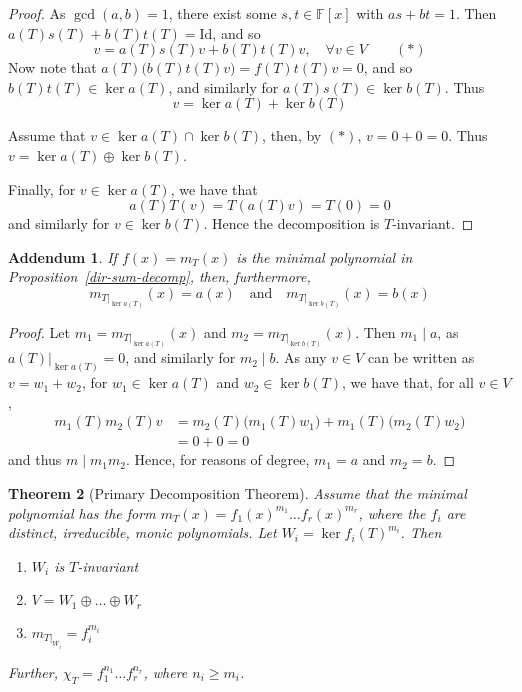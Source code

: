 \documentclass[10pt,fleqn]{article}
\newcommand{\id}{\mathrm{Id}}
\newcommand{\field}{\mathbb{F}}
\theoremstyle{definition} \newtheorem{defn}{Definition}[section]
\theoremstyle{plain}      \newtheorem{thm}[defn]{Theorem}
\theoremstyle{plain}      \newtheorem{prop}[defn]{Proposition}
\theoremstyle{plain}      \newtheorem{lem}[defn]{Lemma}
\theoremstyle{plain}      \newtheorem{cor}[defn]{Corollary}
\theoremstyle{plain}      \newtheorem{ad}[defn]{Addendum}
\theoremstyle{definition} \newtheorem{ex}[defn]{Example}
\theoremstyle{definition} \newtheorem{rem}[defn]{Remark}
\numberwithin{equation}{subsection}
\begin{document}
\begin{proof}
    As $\gcd(a,b)=1$, there exist some $s,t\in\field[x]$ with $as+bt=1$.
    Then $a(T)s(T)+b(T)t(T)=\id$, and so
    \[
        v=a(T)s(T)v+b(T)t(T)v,\quad\forall v\in V\qquad(*)
    \]
    Now note that $a(T)\big(b(T)t(T)v\big)=f(T)t(T)v=0$, and so $b(T)t(T)\in\ker a(T)$, and similarly for $a(T)s(T)\in\ker b(T)$.
    Thus
    \[
        v=\ker a(T)+\ker b(T)
    \]

    Assume that $v\in\ker a(T)\cap\ker b(T)$, then, by $(*)$, $v=0+0=0$.
    Thus $v=\ker a(T)\oplus\ker b(T)$.

    Finally, for $v\in\ker a(T)$, we have that
    \[
        a(T)T(v)=T(a(T)v)=T(0)=0
    \]
    and similarly for $v\in\ker b(T)$.
    Hence the decomposition is $T$-invariant.
\end{proof}

\begin{ad}\label{dir-sum-decomp-min}
    If $f(x)=m_T(x)$ is the minimal polynomial in Proposition~\ref{dir-sum-decomp}, then, furthermore,
    \[
        m_{T|_{\ker a(T)}}(x)=a(x)\quad\text{and}\quad
        m_{T|_{\ker b(T)}}(x)=b(x)
    \]
\end{ad}

\begin{proof}
    Let $m_1=m_{T|_{\ker a(T)}}(x)$ and $m_2=m_{T|_{\ker b(T)}}(x)$.
    Then $m_1\mid a$, as $a(T)|_{\ker a(T)}=0$, and similarly for $m_2\mid b$.
    As any $v\in V$ can be written as $v=w_1+w_2$, for $w_1\in\ker a(T)$ and $w_2\in\ker b(T)$, we have that, for all $v\in V$,
    \begin{align*}
        m_1(T)m_2(T)v
        &=
        m_2(T)\big(m_1(T)w_1\big)+m_1(T)\big(m_2(T)w_2\big)\\
        &=
        0+0=0
    \end{align*}
    and thus $m\mid m_1m_2$.
    Hence, for reasons of degree, $m_1=a$ and $m_2=b$.
\end{proof}

\begin{thm}[Primary Decomposition Theorem]
    Assume that the minimal polynomial has the form $m_T(x)=f_1(x)^{m_1}\ldots f_r(x)^{m_r}$, where the $f_i$ are distinct, irreducible, monic polynomials.
    Let $W_i=\ker f_i(T)^{m_i}$.
    Then
    \begin{enumerate}
        \item $W_i$ is $T$-invariant
        \item $V=W_1\oplus\ldots\oplus W_r$
        \item $m_{T|_{W_i}}=f_i^{m_i}$
    \end{enumerate}

    Further, $\chi_T=f_1^{n_1}\ldots f_r^{n_r}$, where $n_i\geq m_i$.
\end{thm}
\end{document}
